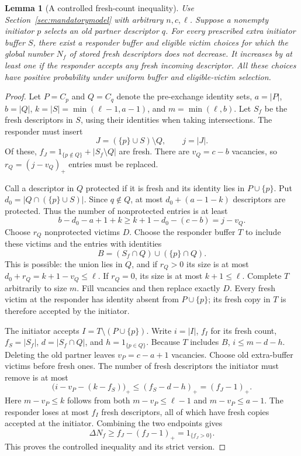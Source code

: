 \documentclass[11pt]{article}
\newtheorem{lemma}[theorem]{Lemma}
\begin{document}
\begin{lemma}[A controlled fresh-count inequality]
\label{lem:fresh}
Use Section~\ref{sec:mandatorymodel} with arbitrary $n,c,\ell$.
Suppose a nonempty initiator $p$ selects an old partner descriptor
$q$. For every prescribed extra initiator buffer $S$, there exist
a responder buffer and eligible victim choices for which the global
number $N_f$ of stored fresh descriptors does not decrease.
It increases by at least one if the responder accepts any fresh
incoming descriptor. All these choices have positive probability
under uniform buffer and eligible-victim selection.
\end{lemma}
\begin{proof}
Let $P=C_p$ and $Q=C_q$ denote the pre-exchange identity sets,
$a=|P|$, $b=|Q|$, $k=|S|=\min(\ell-1,a-1)$, and
$m=\min(\ell,b)$. Let $S_f$ be the fresh descriptors in $S$,
using their identities when taking intersections. The responder
must insert
\[
 J=(\{p\}\cup S)\setminus Q,\qquad j=|J|.
\]
Of these, $f_J=1_{\{p\notin Q\}}+|S_f\setminus Q|$ are fresh.
There are $v_Q=c-b$ vacancies, so
$r_Q=(j-v_Q)_+$ entries must be replaced.

Call a descriptor in $Q$ protected if it is fresh and its identity
lies in $P\cup\{p\}$. Put $d_0=|Q\cap(\{p\}\cup S)|$.
Since $q\notin Q$, at most $d_0+(a-1-k)$ descriptors are protected.
Thus the number of nonprotected entries is at least
\[
 b-d_0-a+1+k
 \ge k+1-d_0-(c-b)=j-v_Q .
\]
Choose $r_Q$ nonprotected victims $D$. Choose the responder buffer
$T$ to include these victims and the entries with identities
\[
 B=(S_f\cap Q)\cup(\{p\}\cap Q).
\]
This is possible: the union lies in $Q$, and if $r_Q>0$ its size
is at most $d_0+r_Q=k+1-v_Q\le\ell$.
If $r_Q=0$, its size is at most $k+1\le\ell$.
Complete $T$ arbitrarily to size $m$. Fill vacancies and then
replace exactly $D$. Every fresh victim at the responder has
identity absent from $P\cup\{p\}$; its fresh copy in $T$ is
therefore accepted by the initiator.

The initiator accepts $I=T\setminus(P\cup\{p\})$.
Write $i=|I|$, $f_I$ for its fresh count, $f_S=|S_f|$,
$d=|S_f\cap Q|$, and $h=1_{\{p\in Q\}}$.
Because $T$ includes $B$, $i\le m-d-h$.
Deleting the old partner leaves $v_P=c-a+1$ vacancies.
Choose old extra-buffer victims before fresh ones. The number of
fresh descriptors the initiator must remove is at most
\[
 \bigl(i-v_P-(k-f_S)\bigr)_+
 \le(f_S-d-h)_+=(f_J-1)_+.
\]
Here $m-v_P\le k$ follows from both
$m-v_P\le\ell-1$ and $m-v_P\le a-1$.
The responder loses at most $f_I$ fresh descriptors, all of which
have fresh copies accepted at the initiator. Combining the two
endpoints gives
\[
 \Delta N_f\ge f_J-(f_J-1)_+
 =1_{\{f_J>0\}} .
\]
This proves the controlled inequality and its strict version.
\end{proof}
\end{document}

